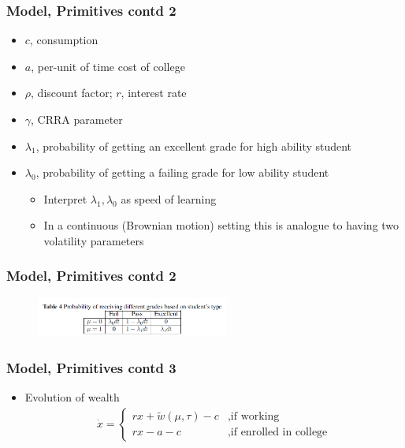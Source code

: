 \begin{frame}
	\frametitle{Model, Primitives contd 2}
		\begin{itemize}
			\item $c$, consumption
			\item $a$, per-unit of time cost of college
			\item $\rho$, discount factor; $r$, interest rate
			\item $\gamma$, CRRA parameter
			\item $\lambda_{1}$, probability of getting an excellent grade for high ability student
			\item $\lambda_{0}$, probability of getting a failing grade for low ability student
				\begin{itemize}
					\item Interpret $\lambda_{1},\lambda_{0}$ as speed of learning
					\item In a continuous (Brownian motion) setting this is analogue to having two volatility parameters
				\end{itemize}
		\end{itemize}
\end{frame}

\begin{frame}
	\frametitle{Model, Primitives contd 2}
		\begin{figure}[H] 
		\caption*{}
		\centering
		\includegraphics[width=2.5in, height=.5in]{Figures/OT/table4.png}
		\end{figure}
\end{frame}

\begin{frame}
	\frametitle{Model, Primitives contd 3}
		\begin{itemize}
			\item Evolution of wealth
				\begin{eqnarray}
					\dot{x} = 
						\begin{cases}
							rx + \tilde{w}(\mu, \tau) - c &, \text{if working} \\
							rx - a - c &, \text{if enrolled in college} \label{eq:x}
						\end{cases}
				\end{eqnarray}
		\end{itemize}
\end{frame}

